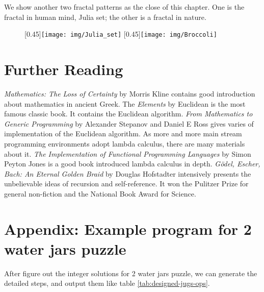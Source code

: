 \documentclass[b5paper]{article}
\begin{document}
We show another two fractal patterns as the close of this chapter. One is the fractal in human mind, Julia set; the other is a fractal in nature.

\begin{figure}[htbp]
 \centering
 [0.45\linewidth]{\texttt{[image: img/Julia\_set]}}
 [0.45\linewidth]{\texttt{[image: img/Broccoli]}}
 \label{fig:more-fractal}
\end{figure}

\section{Further Reading}

{\em Mathematics: The Loss of Certainty} by Morris Kline contains good introduction about mathematics in ancient Greek. The {\em Elements} by Euclidean is the most famous classic book. It contains the Euclidean algorithm. {\em From Mathematics to Generic Programming} by Alexander Stepanov and Daniel E Ross gives varies of implementation of the Euclidean algorithm. As more and more main stream programming environments adopt lambda calculus, there are many materials about it. {\em The Implementation of Functional Programming Languages} by Simon Peyton Jones is a good book introduced lambda calculus in depth. {\em Gödel, Escher, Bach: An Eternal Golden Braid} by Douglas Hofstadter intensively presents the unbelievable ideas of recursion and self-reference. It won the Pulitzer Prize for general non-fiction and the National Book Award for Science.

\section{Appendix: Example program for 2 water jars puzzle}

After figure out the integer solutions for 2 water jars puzzle, we can generate the detailed steps, and output them like table \ref{tab:designed-jugs-ops}.

\lstset{frame=single}
\end{document}

